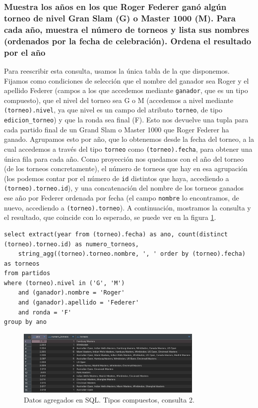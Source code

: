 \subsubsection{Muestra los años en los que Roger Federer ganó algún torneo de nivel Gran Slam (G) o Master 1000 (M). Para cada año, muestra el número de torneos y lista sus nombres (ordenados por la fecha de celebración). Ordena el resultado por el año}

Para reescribir esta consulta, usamos la única tabla de la que disponemos. Fijamos como condiciones de selección que el nombre del ganador sea Roger y el apellido Federer (campos a los que accedemos mediante \texttt{ganador}, que es un tipo compuesto), que el nivel del torneo sea G o M (accedemos a nivel mediante \texttt{(torneo).nivel}, ya que nivel es un campo del atributo \texttt{torneo}, de tipo \texttt{edicion\_torneo}) y que la ronda sea final (F). Esto nos devuelve una tupla para cada partido final de un Grand Slam o Master 1000 que Roger Federer ha ganado. Agrupamos esto por año, que lo obtenemos desde la fecha del torneo, a la cual accedemos a través del tipo \texttt{torneo} como \texttt{(torneo).fecha}, para obtener una única fila para cada año. Como proyección nos quedamos con el año del torneo (de los torneos concretamente), el número de torneos que hay en esa agrupación (los podemos contar por el número de \texttt{id} distintos que haya, accediendo a \texttt{(torneo).torneo.id}), y una concatenación del nombre de los torneos ganados ese año por Federer ordenada por fecha (el campo \texttt{nombre} lo encontramos, de nuevo, accediendo a \texttt{(torneo).torneo}). A continuación, mostramos la consulta y el resultado, que coincide con lo esperado, se puede ver en la figura \ref{fig:q2_com}.

\begin{verbatim}
select extract(year from (torneo).fecha) as ano, count(distinct (torneo).torneo.id) as numero_torneos, 
	string_agg((torneo).torneo.nombre, ', ' order by (torneo).fecha) as torneos
from partidos
where (torneo).nivel in ('G', 'M')
	and (ganador).nombre = 'Roger'
	and (ganador).apellido = 'Federer'
	and ronda = 'F'
group by ano
\end{verbatim}

\begin{figure}[H]
\centering
\includegraphics[width=0.8\textwidth]{fotos/q2_com.png}
\caption{Datos agregados en SQL. Tipos compuestos, consulta 2.}
\label{fig:q2_com}
\end{figure}





